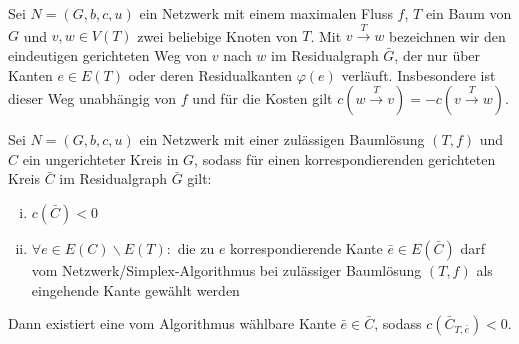 \begin{nota}Sei $N=(G,b,c,u)$ ein Netzwerk mit einem maximalen Fluss $f$, $T$ ein Baum von $G$ und $v,w\in V(T)$ zwei beliebige Knoten von $T$. Mit $v\xrightarrow{T}w$ bezeichnen wir den eindeutigen gerichteten Weg von $v$ nach $w$ im Residualgraph $\bar{G}$, der nur über Kanten $e\in E(T)$ oder deren Residualkanten $\varphi(e)$ verläuft. Insbesondere ist dieser Weg unabhängig von $f$ und für die Kosten gilt $c(w\xrightarrow{T}v) = -c(v\xrightarrow{T}w)$.\end{nota}

\begin{lem}\label{iterierbar}Sei $N=(G,b,c,u)$ ein Netzwerk mit einer zulässigen Baumlösung $(T,f)$ und $C$ ein ungerichteter Kreis in $G$, sodass für einen korrespondierenden gerichteten Kreis $\bar{C}$ im Residualgraph $\bar{G}$ gilt:
\begin{enumerate}[(i)]
	\item $c(\bar{C})<0$\label{negativ}
	\item $\forall e\in E(C)\backslash E(T) \colon$ die zu $e$ korrespondierende Kante $\bar{e}\in E(\bar{C})$ darf vom Netzwerk\-/Simplex-Algorithmus bei zulässiger Baumlösung $(T,f)$ als eingehende Kante gewählt werden\label{wählbar}
\end{enumerate}
Dann existiert eine vom Algorithmus wählbare Kante $\bar{e}\in\bar{C}$, sodass $c(\bar{C}_{T,\bar{e}})<0$.
\end{lem}
